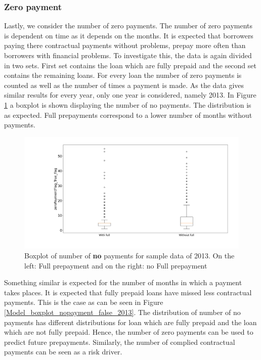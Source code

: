     \subsubsection{Zero payment}
    Lastly, we consider the number of zero payments. The number of
    zero payments is dependent on time as it depends on the months.
    It is expected that borrowers paying there contractual payments
    without problems, prepay more often than borrowers with
    financial problems. To investigate this, the data is again
    divided in two sets. First set contains the loan which are fully
    prepaid and the second set contains the remaining loans. For
    every loan the number of zero payments is counted as well as the
    number of times a payment is made. As the data gives similar
    results for every year, only one year is considered, namely
    2013. In Figure \ref{Model_boxplot_nopayment_true_2013} a
    boxplot is shown displaying the number of no payments. The
    distribution is as expected. Full prepayments correspond to  a
    lower number of months without payments. 
        \begin{figure}[H]
        \centering
        \includegraphics[width=\linewidth]{Latex/Report/Figures/payment_true_2013.png}
        \caption{Boxplot of number of \textbf{no} payments for sample data of 2013. On the left: Full prepayment and on the right: no Full prepayment}
        \label{Model_boxplot_nopayment_true_2013}
    \end{figure}
    \noindent
    Something similar is expected for the number of months in which
    a payment takes places. It is expected that fully prepaid loans
    have missed less contractual payments. This is the case as can
    be seen in Figure \ref{Model_boxplot_nopayment_false_2013}. The
    distribution of number of no payments has different
    distributions for loan which are fully prepaid and the loan
    which are not fully prepaid. Hence, the number of zero payments
    can be used to predict future prepayments. Similarly, the number
    of complied contractual payments can be seen as a risk driver. 
    
